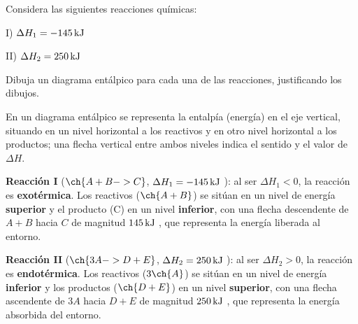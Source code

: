 \begin{exercise}
    Considera las siguientes reacciones químicas:

    I)   \(\Delta H_1 = \energia[kj]{-145}\)

    II)   \(\Delta H_2 = \energia[kj]{250}\)

    Dibuja un diagrama entálpico para cada una de las reacciones, justificando los dibujos.


    \begin{solu}


        En un diagrama entálpico se representa la entalpía (energía) en el eje vertical, situando en un nivel horizontal a los reactivos y en otro nivel horizontal a los productos; una flecha vertical entre ambos niveles indica el sentido y el valor de \(\Delta H\).

        \textbf{Reacción I} (\(\ch{A + B -> C}\), \(\Delta H_1 = \energia[kj]{-145}\)): al ser \(\Delta H_1 < 0\), la reacción es \textbf{exotérmica}. Los reactivos (\(\ch{A+B}\)) se sitúan en un nivel de energía \textbf{superior} y el producto (C) en un nivel \textbf{inferior}, con una flecha descendente de \(A+B\) hacia \(C\) de magnitud \(\energia[kj]{145}\), que representa la energía liberada al entorno.

        \textbf{Reacción II} (\(\ch{3 A -> D + E}\), \(\Delta H_2 = \energia[kj]{250}\)): al ser \(\Delta H_2 > 0\), la reacción es \textbf{endotérmica}. Los reactivos (\(3\ch{A}\)) se sitúan en un nivel de energía \textbf{inferior} y los productos (\(\ch{D+E}\)) en un nivel \textbf{superior}, con una flecha ascendente de \(3A\) hacia \(D+E\) de magnitud \(\energia[kj]{250}\), que representa la energía absorbida del entorno.
    \end{solu}

\end{exercise}

